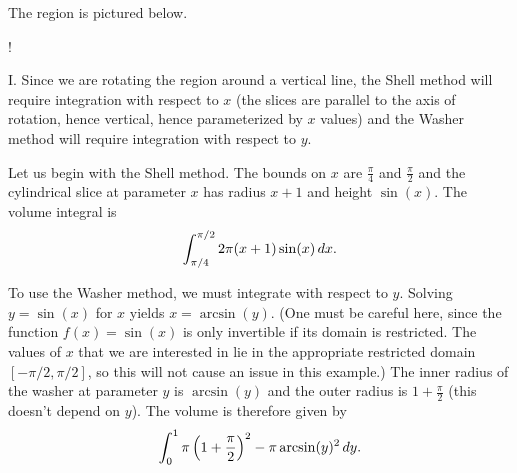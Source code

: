 \documentclass[]{ximera}
\begin{document}
\begin{freeResponse}
The region is pictured below. 
\begin{center}
\resizebox {6cm} {!} {
}
	\end{center}
	
I. Since we are rotating the region around a vertical line, the Shell method will require integration with respect to $x$ (the slices are parallel to the axis of rotation, hence vertical, hence parameterized by $x$ values) and the Washer method will require integration with respect to $y$. 

Let us begin with the Shell method. The bounds on $x$ are $\frac{\pi}{4}$ and $\frac{\pi}{2}$ and the cylindrical slice at parameter $x$ has radius $x+1$ and height $\sin (x)$. The volume integral is
$$
\int_{\pi/4}^{\pi/2} 2\pi (x+1) \sin (x) \mathop{}\!d x.
$$

To use the Washer method, we must integrate with respect to $y$. Solving $y=\sin (x)$ for $x$ yields $x = \arcsin (y)$. (One must be careful here, since the function $f(x) = \sin(x)$ is only invertible if its domain is restricted. The values of $x$ that we are interested in lie in the appropriate restricted domain $[-\pi/2,\pi/2]$, so this will not cause an issue in this example.) The inner radius of the washer at parameter $y$ is $\arcsin(y)$ and the outer radius is $1+\frac{\pi}{2}$ (this doesn't depend on $y$). The volume is therefore given by
$$
\int_0^1 \pi \left(1+ \frac{\pi}{2}\right)^2 - \pi \arcsin(y)^2 \mathop{}\!d y.
$$


\end{freeResponse}
\end{document}
